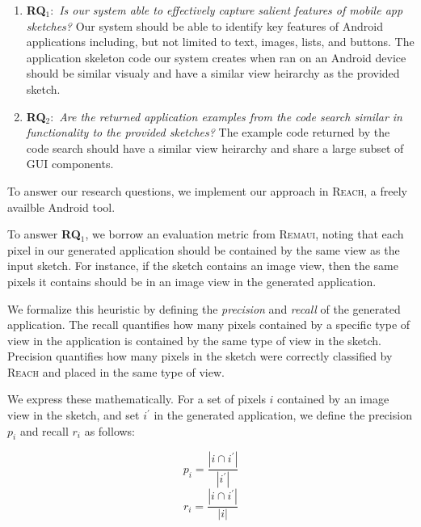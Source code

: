 \documentclass[10pt,twocolumn]{article}
\begin{document}
\begin{enumerate}

\item \textbf{RQ$_1:$}  \textit{Is our system able to effectively capture salient features of mobile app sketches?} Our system should be able to identify key features of Android applications including, but not limited to text, images, lists, and buttons. The application skeleton code our system creates when ran on an Android device should be similar visualy and have a similar view heirarchy as the provided sketch.

\item \textbf{RQ$_2:$} \textit{Are the returned application examples from the code search similar in functionality to the provided sketches?} The example code returned by the code search should have a similar view heirarchy and share a large subset of GUI components.

\end{enumerate}

To answer our research questions, we implement our approach in \textsc{Reach}, a
freely availble Android tool.


To answer \textbf{RQ$_1$}, we borrow an evaluation metric from \textsc{Remaui},
\cite{remaui} noting that each pixel in our generated application should be
contained by the same view as the input sketch.  For instance, if the sketch
contains an image view, then the same pixels it contains should be in an image
view in the generated application.

We formalize this heuristic by defining the \textit{precision} and
\textit{recall} of the generated application.  The recall quantifies how many
pixels contained by a specific type of view in the application is contained by
the same type of view in the sketch.  Precision quantifies how many pixels in
the sketch were correctly classified by \textsc{Reach} and placed in the same
type of view.

We express these mathematically.  For a set of pixels $i$ contained by an image
view in the sketch, and set $i^\prime$ in the generated application, we define
the precision $p_i$ and recall $r_i$ as follows:

\begin{equation}
  p_i = \frac{\left|i \cap i^\prime\right|}{\left|i^\prime\right|}
\end{equation}
\begin{equation}
  r_i = \frac{\left|i \cap i^\prime\right|}{\left|i\right|}
\end{equation}
\end{document}
